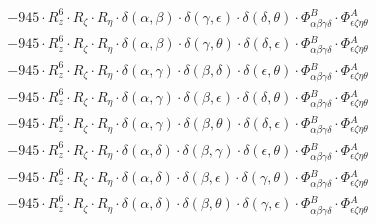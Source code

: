\documentclass{article}
\begin{document}
\begin{equation}
\begin{array}{c}
 \\[0.2em] 		 - 945 \cdot R_{z}^{6} \cdot R_{\zeta{}} \cdot R_{\eta{}} \cdot \delta{}\left(\alpha{}, \beta{}\right) \cdot \delta{}\left(\gamma{}, \epsilon{}\right) \cdot \delta{}\left(\delta{}, \theta{}\right) \cdot \Phi{}^{B}_{\alpha{}\beta{}\gamma{}\delta{}} \cdot \Phi{}^{A}_{\epsilon{}\zeta{}\eta{}\theta{}} 
 \\[0.2em] 		 - 945 \cdot R_{z}^{6} \cdot R_{\zeta{}} \cdot R_{\eta{}} \cdot \delta{}\left(\alpha{}, \beta{}\right) \cdot \delta{}\left(\gamma{}, \theta{}\right) \cdot \delta{}\left(\delta{}, \epsilon{}\right) \cdot \Phi{}^{B}_{\alpha{}\beta{}\gamma{}\delta{}} \cdot \Phi{}^{A}_{\epsilon{}\zeta{}\eta{}\theta{}} 
 \\[0.2em] 		 - 945 \cdot R_{z}^{6} \cdot R_{\zeta{}} \cdot R_{\eta{}} \cdot \delta{}\left(\alpha{}, \gamma{}\right) \cdot \delta{}\left(\beta{}, \delta{}\right) \cdot \delta{}\left(\epsilon{}, \theta{}\right) \cdot \Phi{}^{B}_{\alpha{}\beta{}\gamma{}\delta{}} \cdot \Phi{}^{A}_{\epsilon{}\zeta{}\eta{}\theta{}} 
 \\[0.2em] 		 - 945 \cdot R_{z}^{6} \cdot R_{\zeta{}} \cdot R_{\eta{}} \cdot \delta{}\left(\alpha{}, \gamma{}\right) \cdot \delta{}\left(\beta{}, \epsilon{}\right) \cdot \delta{}\left(\delta{}, \theta{}\right) \cdot \Phi{}^{B}_{\alpha{}\beta{}\gamma{}\delta{}} \cdot \Phi{}^{A}_{\epsilon{}\zeta{}\eta{}\theta{}} 
 \\[0.2em] 		 - 945 \cdot R_{z}^{6} \cdot R_{\zeta{}} \cdot R_{\eta{}} \cdot \delta{}\left(\alpha{}, \gamma{}\right) \cdot \delta{}\left(\beta{}, \theta{}\right) \cdot \delta{}\left(\delta{}, \epsilon{}\right) \cdot \Phi{}^{B}_{\alpha{}\beta{}\gamma{}\delta{}} \cdot \Phi{}^{A}_{\epsilon{}\zeta{}\eta{}\theta{}} 
 \\[0.2em] 		 - 945 \cdot R_{z}^{6} \cdot R_{\zeta{}} \cdot R_{\eta{}} \cdot \delta{}\left(\alpha{}, \delta{}\right) \cdot \delta{}\left(\beta{}, \gamma{}\right) \cdot \delta{}\left(\epsilon{}, \theta{}\right) \cdot \Phi{}^{B}_{\alpha{}\beta{}\gamma{}\delta{}} \cdot \Phi{}^{A}_{\epsilon{}\zeta{}\eta{}\theta{}} 
 \\[0.2em] 		 - 945 \cdot R_{z}^{6} \cdot R_{\zeta{}} \cdot R_{\eta{}} \cdot \delta{}\left(\alpha{}, \delta{}\right) \cdot \delta{}\left(\beta{}, \epsilon{}\right) \cdot \delta{}\left(\gamma{}, \theta{}\right) \cdot \Phi{}^{B}_{\alpha{}\beta{}\gamma{}\delta{}} \cdot \Phi{}^{A}_{\epsilon{}\zeta{}\eta{}\theta{}} 
 \\[0.2em] 		 - 945 \cdot R_{z}^{6} \cdot R_{\zeta{}} \cdot R_{\eta{}} \cdot \delta{}\left(\alpha{}, \delta{}\right) \cdot \delta{}\left(\beta{}, \theta{}\right) \cdot \delta{}\left(\gamma{}, \epsilon{}\right) \cdot \Phi{}^{B}_{\alpha{}\beta{}\gamma{}\delta{}} \cdot \Phi{}^{A}_{\epsilon{}\zeta{}\eta{}\theta{}} 

\end{array}
\end{equation}
\end{document}
